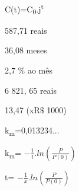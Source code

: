 \begin{respostas}{8}

    \ansitem{} C(t)=C\textsubscript{0}.j\textsuperscript{t}

    \ansitem{} 587,71 reais

    \ansitem{} 36,08 meses

    \ansitem{} 2,7 $\%$  ao mês 

    \ansitem{} 6 821, 65 reais

    \ansitem{} 13,47 (xR$\$$ 1000)

    \ansitem{} k\textsubscript{m}=0,013234...

    \ansitem{} k\textsubscript{m}=  \( -\frac{1}{t} . ln \left( \frac{P}{P \left( 0 \right) } \right)  \)  

    \ansitem{} t=  \( -\frac{1}{x} .ln \left( \frac{P}{P \left( 0 \right) } \right)  \) 

\end{respostas}